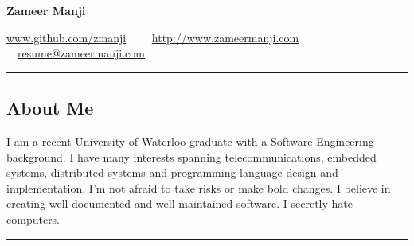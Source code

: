 \documentclass[10pt,letterpaper]{article}
\begin{document}
\begin{center}
{\huge \textbf{Zameer Manji}}


\href{http://www.github.com/zmanji/}{www.github.com/zmanji}\ \ \textbullet
\ \ \href{http://www.zameermanji.com}{http://www.zameermanji.com}\ \ \textbullet
\ \ \href{malto:resume@zameermanji.com}{resume@zameermanji.com}

\end{center}

\hrule
\vspace{-0.4em}
\subsection*{About Me}
I am a recent University of Waterloo graduate with a Software Engineering
background. I have many interests spanning telecommunications, embedded systems,
distributed systems and programming language design and implementation. I'm not
afraid to take risks or make bold changes. I believe in creating well documented
and well maintained software.  I secretly hate computers.
\\

\hrule
\vspace{-0.4em}
\end{document}
